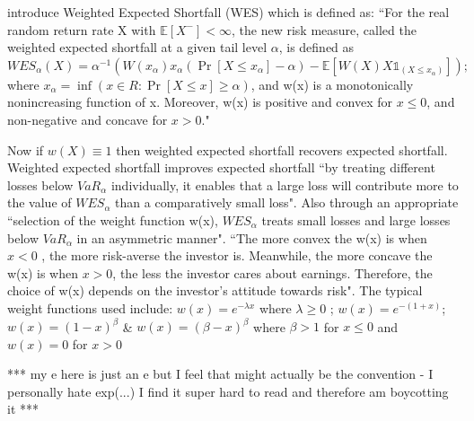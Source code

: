 \documentclass[12pt,a4paper]{article}
\newcommand{\e}[1]{{\mathbb E}\left[ #1 \right]}
\begin{document}
\cite{CHEN20111777} introduce Weighted Expected Shortfall (WES) which is defined as: ``For the real random return rate X with $\e{X^{-}} < \infty$, the new risk measure, called the weighted expected shortfall at a given tail level $\alpha$, is defined as
$WES_{\alpha}(X)= \alpha^{-1}(W(x_{\alpha})x_{\alpha}(\Pr[X \leq x_{\alpha}]-\alpha)-\e{W(X)X\mathbb{1}_{(X \leq x_{\alpha})}}) ;$ 
where $ x_{\alpha} = \inf( {x \in R : \Pr[X \leq x] \geq \alpha })$, and w(x) is a monotonically nonincreasing function of x. Moreover, w(x) is positive and convex for
$x \leq 0$, and non-negative and concave for $x>0$."

 Now if $ w(X) \equiv 1$ then weighted expected shortfall recovers expected shortfall. Weighted expected shortfall improves expected shortfall ``by treating different losses below $VaR_{\alpha}$ individually, it enables that a large loss will contribute more to the value of $WES_{\alpha}$ than a comparatively small loss". Also through an appropriate ``selection of the weight function w(x), $WES_{\alpha}$ treats small losses and large losses below $VaR_{\alpha}$ in an asymmetric manner". ``The more convex the w(x) is when $ x < 0$ , the more risk-averse the investor is. Meanwhile, the more concave the w(x) is when $x > 0 $, the less the investor cares about earnings. Therefore, the choice of w(x) depends on the investor’s attitude towards risk". The typical weight functions used include: $ w(x)= e^{-\lambda x} $ where $\lambda \geq 0$ ; $w(x) = e^{-(1+x)}$; $w(x) = (1-x)^{\beta} $ \& $w(x) = (\beta -x)^{\beta} $ where $\beta > 1$ for $ x \leq 0 $ and $w(x) = 0$ for $x > 0 $ 
 
 *** my e here is just an e but I feel that might actually be the convention - I personally hate exp(...) I find it super hard to read and therefore am boycotting it ***
 
\end{document}
